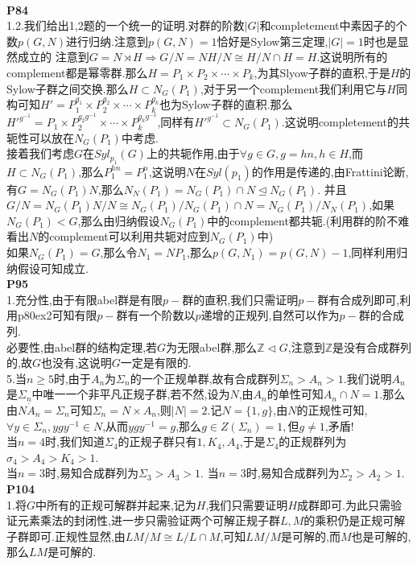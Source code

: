 \documentclass[b5paper,twoside]{ctexart}
\begin{document}
\pagestyle{plain}
\noindent\\
\textbf{P84}\\
1.2.我们给出1,2题的一个统一的证明.对群的阶数$|G|$和completement中素因子的个数$p(G,N)$进行归纳.注意到$p(G,N)=1$恰好是Sylow第三定理,$|G|=1$时也是显然成立的
注意到$G=N\rtimes H\Rightarrow G/N=NH/N\cong H/N\cap H=H$.这说明所有的complement都是幂零群.那么$H=P_1\times P_2\times \cdots \times P_k$,为其Slyow子群的直积,于是$H$的Sylow子群之间交换.那么$H\subset N_G(P_1)$,对于另一个complement我们利用它与$H$同构可知$H'=P_1^{g_1}\times P_2^{g_2}\times \cdots \times P_k^{g_k}$也为Sylow子群的直积.那么$H'^{g^{-1}}=P_1\times P_2^{g_2g^{-1}}\times \cdots \times P_k^{g_kg^{-1}}$,同样有$H'^{g^{-1}}\subset N_G(P_1)$.这说明completement的共轭性可以放在$N_G(P_1)$中考虑.\\
接着我们考虑$G$在$Syl_{p_1}(G)$上的共轭作用,由于$\forall g\in G, g=hn,h\in H$,而$H\subset N_G(P_1)$,那么$P_1^{hn}=P_1^n$,这说明$N$在$Syl(p_1)$的作用是传递的,由Frattini论断,有$G=N_G(P_1)N$,那么$N_N(P_1)=N_G(P_1)\cap N\unlhd N_G(P_1)$.
并且$G/N=N_G(P_1)N/N\cong N_G(P_1)/N_G(P_1)\cap N=N_G(P_1)/N_N(P_1)$,如果$N_G(P_1)<G$,那么由归纳假设$N_G(P_1)$中的complement都共轭.(利用群的阶不难看出$N$的complement可以利用共轭对应到$N_G(P_1)$中)\\
如果$N_G(P_1)=G$,那么令$N_1=NP_1$,那么$p(G,N_1)=p(G,N)-1$,同样利用归纳假设可知成立.\\
\textbf{P95}\\
1.充分性,由于有限abel群是有限$p-$群的直积,我们只需证明$p-$群有合成列即可,利用p80ex2可知有限$p-$群有一个阶数以$p$递增的正规列,自然可以作为$p-$群的合成列.\\
必要性,由abel群的结构定理,若$G$为无限abel群,那么$\mathbb{Z}\lhd G$,注意到$\mathbb{Z}$是没有合成群列的,故$G$也没有,这说明$G$一定是有限的.\\
5.当$n\geq 5$时,由于$A_n$为$\Sigma_n$的一个正规单群,故有合成群列$\Sigma_n>A_n>1$.我们说明$A_n$是$\Sigma_n$中唯一一个非平凡正规子群,若不然,设为$N$,由$A_n$的单性可知$A_n\cap N=1$.那么由$N\dot A_n=\Sigma_n$可知$\Sigma_n=N\times A_n$,则$|N|=2$.记$N=\{1,g\}$,由$N$的正规性可知,$\forall y\in \Sigma_n,ygy^{-1}\in N$,从而$ygy^{-1}=g$,那么$g\in Z(\Sigma_n)=1,$但$g\neq 1$,矛盾!\\
当$n=4$时,我们知道$\Sigma_4$的正规子群只有$1,K_4,A_4$,于是$\Sigma_4$的正规群列为$\sigma_4>A_4>K_4>1$.\\
当$n=3$时,易知合成群列为$\Sigma_3>A_3>1$.
当$n=3$时,易知合成群列为$\Sigma_2>A_2>1$.\\
\textbf{P104}\\
1.将$G$中所有的正规可解群并起来,记为$H$,我们只需要证明$H$成群即可.为此只需验证元素乘法的封闭性,进一步只需验证两个可解正规子群$L,M$的乘积仍是正规可解子群即可.正规性显然,由$LM/M\cong L/L\cap M$,可知$LM/M$是可解的,而$M$也是可解的,那么$LM$是可解的.\\
\end{document}
